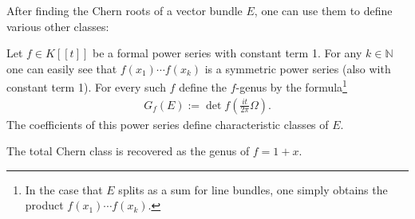 
    After finding the Chern roots of a vector bundle $E$, one can use them to define various other classes:
    \begin{construct}[Genus]
        Let $f\in K[[t]]$ be a formal power series with constant term 1. For any $k\in\mathbb{N}$ one can easily see that $f(x_1)\cdots f(x_k)$ is a symmetric power series (also with constant term 1). For every such $f$ define the $f$-genus by the formula\footnote{In the case that $E$ splits as a sum for line bundles, one simply obtains the product $f(x_1)\cdots f(x_k)$.}
        \begin{gather}
            G_f(E) := \det f\left(\frac{it}{2\pi}\Omega\right).
        \end{gather}
        The coefficients of this power series define characteristic classes of $E$.
    \end{construct}

    \begin{example}
        The total Chern class is recovered as the genus of $f=1+x$.
    \end{example}

